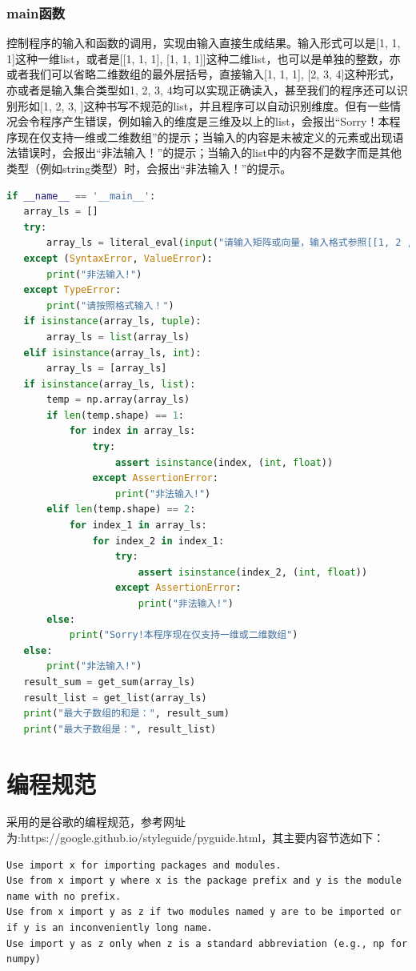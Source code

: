 \documentclass{article}
\begin{document}
\subsubsection{main函数}
控制程序的输入和函数的调用，实现由输入直接生成结果。输入形式可以是[1, 1, 1]这种一维list，或者是[[1, 1, 1], [1, 1, 1]]这种二维list，也可以是单独的整数，亦或者我们可以省略二维数组的最外层括号，直接输入[1, 1, 1], [2, 3, 4]这种形式，亦或者是输入集合类型如{1, 2, 3, 4}均可以实现正确读入，甚至我们的程序还可以识别形如[1, 2, 3, ]这种书写不规范的list，并且程序可以自动识别维度。\textcolor[rgb]{0,0.8,1}{但有一些情况会令程序产生错误，例如输入的维度是三维及以上的list，会报出“Sorry！本程序现在仅支持一维或二维数组”的提示；当输入的内容是未被定义的元素或出现语法错误时，会报出“非法输入！”的提示；当输入的list中的内容不是数字而是其他类型（例如string类型）时，会报出“非法输入！”的提示。}
\begin{lstlisting}[language = Python]
if __name__ == '__main__':
   array_ls = []
   try:
       array_ls = literal_eval(input("请输入矩阵或向量，输入格式参照[[1, 2 ,3], [4, 5, 6]]或[1, 2, 3, 4], [1, 2, 3, 4]:"))
   except (SyntaxError, ValueError):
       print("非法输入!")
   except TypeError:
       print("请按照格式输入！")
   if isinstance(array_ls, tuple):
       array_ls = list(array_ls)
   elif isinstance(array_ls, int):
       array_ls = [array_ls]
   if isinstance(array_ls, list):
       temp = np.array(array_ls)
       if len(temp.shape) == 1:
           for index in array_ls:
               try:
                   assert isinstance(index, (int, float))
               except AssertionError:
                   print("非法输入!")
       elif len(temp.shape) == 2:
           for index_1 in array_ls:
               for index_2 in index_1:
                   try:
                       assert isinstance(index_2, (int, float))
                   except AssertionError:
                       print("非法输入!")
       else:
           print("Sorry!本程序现在仅支持一维或二维数组")
   else:
       print("非法输入!")
   result_sum = get_sum(array_ls)
   result_list = get_list(array_ls)
   print("最大子数组的和是：", result_sum)
   print("最大子数组是：", result_list)

\end{lstlisting}
\section{编程规范}
\large 
采用的是谷歌的编程规范，参考网址为:https://google.github.io/styleguide/pyguide.html，其主要内容节选如下：
\begin{lstlisting}
Use import x for importing packages and modules.
Use from x import y where x is the package prefix and y is the module name with no prefix.
Use from x import y as z if two modules named y are to be imported or if y is an inconveniently long name.
Use import y as z only when z is a standard abbreviation (e.g., np for numpy) 
\end{lstlisting}
\end{document}
